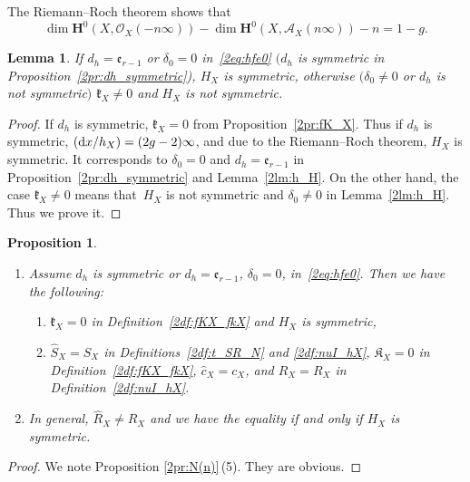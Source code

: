 \documentclass[pdftex]{sigma}
\def\bH{{\mathbf F}}
\def\bH{{\mathbf H}}
\def\cA{{\mathcal A}}
\def\cO{{\mathcal O}}
\def\fK{{\mathfrak K}}
\def\fe{{\mathfrak e}}
\def\fk{{\mathfrak k}}
\def\hc{{\widehat c}}
\def\hR{{\widehat R}}
\def\hS{{\widehat S}}
\numberwithin{equation}{section}
\newtheorem{Lemma}[Theorem]{Lemma}
\newtheorem{Proposition}[Theorem]{Proposition}
 { \theoremstyle{definition}
\newtheorem{Definition}[Theorem]{Definition}
\newtheorem{Note}[Theorem]{Note}
\newtheorem{Example}[Theorem]{Example}
\newtheorem{Remark}[Theorem]{Remark} }
\begin{document}
The Riemann--Roch theorem shows that
\begin{equation*}
\dim \bH^0(X, \cO_X(-n\infty))-\dim \bH^0(X, \cA_X(n\infty))-n=1-g.%
\end{equation*}

\begin{Lemma}\label{2lm:nuIo1}
If $d_h=\fe_{r-1}$ or $\delta_0 = 0$ in~\eqref{2eq:hfe0} $(d_h$ is symmetric in Proposition~{\rm \ref{2pr:dh_symmetric})}, $H_X$ is symmetric, otherwise $(\delta_0 \neq 0$ or $d_h$ is not symmetric$)$ $\fk_X\neq 0$ and $H_X$ is not symmetric.
\end{Lemma}

\begin{proof}If $d_h$ is symmetric, $\fk_X=0$ from Proposition~\ref{2pr:fK_X}.
Thus if $d_h$ is symmetric, $({\rm d} x/h_X)=(2g-2)\infty$, and due to the Riemann--Roch theorem, $H_X$ is symmetric.
It corresponds to $\delta_0 = 0$ and $d_h = \fe_{r-1}$ in Proposition~\ref{2pr:dh_symmetric} and Lemma~\ref{2lm:h_H}.
On the other hand, the case $\fk_X\neq 0$ means that~$H_X$ is not symmetric and $\delta_0 \neq 0$ in Lemma~\ref{2lm:h_H}. Thus we prove it.
\end{proof}

\begin{Proposition}\label{2pr:dh_HXsymmetric}\quad
\begin{enumerate}\itemsep=0pt
\item[$1.$] Assume $d_h$ is symmetric or $d_h = \fe_{r-1}$, $\delta_0 = 0$, in~\eqref{2eq:hfe0}.
Then we have the following:
\begin{enumerate}\itemsep=0pt
\item[$(a)$] $\fk_X=0$ in Definition~{\rm \ref{2df:fKX_fkX}} and $H_X$ is symmetric,

\item[$(b)$] $\hS_X = S_X$ in Definitions~{\rm \ref{2df:t_SR_N}} and {\rm \ref{2df:nuI_hX}}, $\fK_X=0$ in Definition~{\rm \ref{2df:fKX_fkX}}, $\hc_X=c_X$, and $\hR_X = R_X$ in Definition~{\rm \ref{2df:nuI_hX}}.
\end{enumerate}
\item[$2.$] In general, $\hR_X \neq R_X$ and we have the equality if and only if $H_X$ is symmetric.
\end{enumerate}
\end{Proposition}

\begin{proof}We note Proposition \ref{2pr:N(n)}\,(5). They are obvious.
\end{proof}
\end{document}
